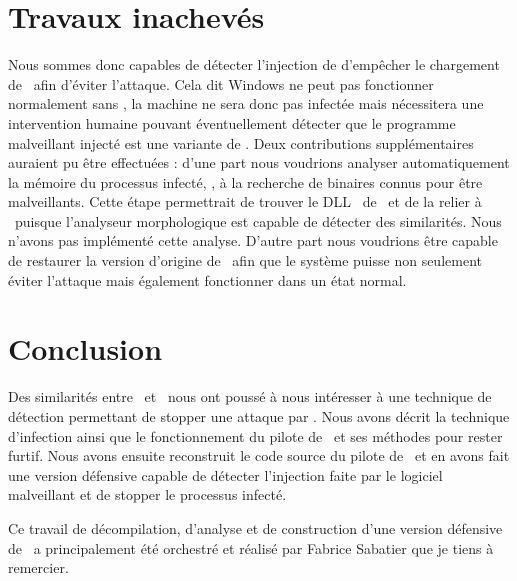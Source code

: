 \section{Travaux inachevés}
Nous sommes donc capables de détecter l'injection de d'empêcher le chargement de \services\ afin d'éviter l'attaque.
Cela dit Windows ne peut pas fonctionner normalement sans \services, la machine ne sera donc pas infectée mais nécessitera une intervention humaine pouvant éventuellement détecter que le programme malveillant injecté est une variante de \stux.
Deux contributions supplémentaires auraient pu être effectuées : d'une part nous voudrions analyser automatiquement la mémoire du processus infecté, \services, à la recherche de binaires connus pour être malveillants. 
Cette étape permettrait de trouver le DLL \netpDLL\ de \duqu\ et de la relier à \stux\ puisque l'analyseur morphologique est capable de détecter des similarités. Nous n'avons pas implémenté cette analyse.
D'autre part nous voudrions être capable de restaurer la version d'origine de \services\ afin que le système puisse non seulement éviter l'attaque mais également fonctionner dans un état normal.

\section{Conclusion}
Des similarités entre \duqu\ et \stux\ nous ont poussé à nous intéresser à une technique de détection permettant de stopper une attaque par \duqu.
Nous avons décrit la technique d'infection ainsi que le fonctionnement du pilote de \duqu\ et ses méthodes pour rester furtif.
Nous avons ensuite reconstruit le code source du pilote de \duqu\ et en avons fait une version défensive capable de détecter l'injection faite par le logiciel malveillant et de stopper le processus infecté.

Ce travail de décompilation, d'analyse et de construction d'une version défensive de \duqu\ a principalement été orchestré et réalisé par Fabrice Sabatier que je tiens à remercier.